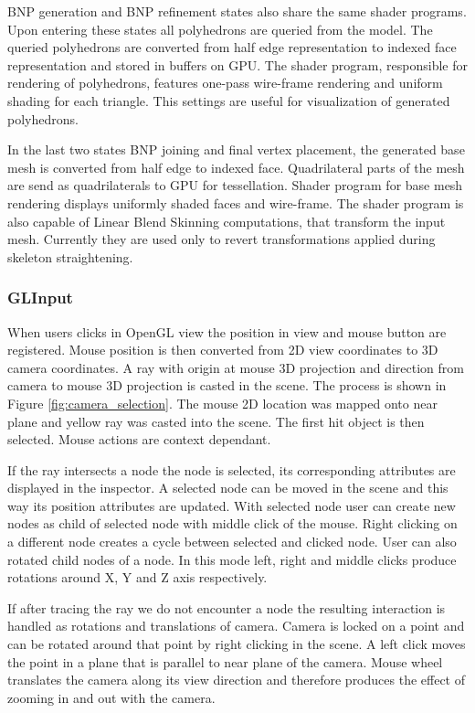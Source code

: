 BNP generation and BNP refinement states also share the same shader programs.
Upon entering these states all polyhedrons are queried from the model.
The queried polyhedrons are converted from half edge representation to indexed face representation and stored in buffers on GPU.
The shader program, responsible for rendering of polyhedrons, features one-pass wire-frame rendering and uniform shading for each triangle.
This settings are useful for visualization of generated polyhedrons.

In the last two states BNP joining and final vertex placement, the generated base mesh is converted from half edge to indexed face.
Quadrilateral parts of the mesh are send as quadrilaterals to GPU for tessellation.
Shader program for base mesh rendering displays uniformly shaded faces and wire-frame.
The shader program is also capable of Linear Blend Skinning computations, that transform the input mesh.
Currently they are used only to revert transformations applied during skeleton straightening.

\subsubsection{GLInput}

When users clicks in OpenGL view the position in view and mouse button are registered.
Mouse position is then converted from 2D view coordinates to 3D camera coordinates.
A ray with origin at mouse 3D projection and direction from camera to mouse 3D projection is casted in the scene.
The process is shown in Figure \ref{fig:camera_selection}.
The mouse 2D location was mapped onto near plane and yellow ray was casted into the scene.
The first hit object is then selected.
Mouse actions are context dependant.

If the ray intersects a node the node is selected, its corresponding attributes are displayed in the inspector.
A selected node can be moved in the scene and this way its position attributes are updated.
With selected node user can create new nodes as child of selected node with middle click of the mouse.
Right clicking on a different node creates a cycle between selected and clicked node.
User can also rotated child nodes of a node.
In this mode left, right and middle clicks produce rotations around X, Y and Z axis respectively.

If after tracing the ray we do not encounter a node the resulting interaction is handled as rotations and translations of camera.
Camera is locked on a point and can be rotated around that point by right clicking in the scene.
A left click moves the point in a plane that is parallel to near plane of the camera.
Mouse wheel translates the camera along its view direction and therefore produces the effect of zooming in and out with the camera.

